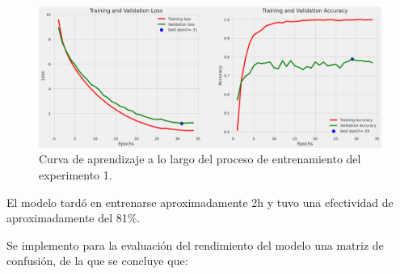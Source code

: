 \begin{figure}[H]
    \begin{center}
        \includegraphics[width=1\textwidth]{./Graphics/training&validation_p1.png}
        \caption{Curva de aprendizaje a lo largo del proceso de entrenamiento del experimento 1.\label{fig:training_validation_loss}}
    \end{center}
\end{figure}

El modelo tardó en entrenarse aproximadamente 2h y tuvo una efectividad de aproximadamente del 81\%.

Se implemento para la evaluación del rendimiento del modelo una matriz de confusión, de la que se concluye que:

